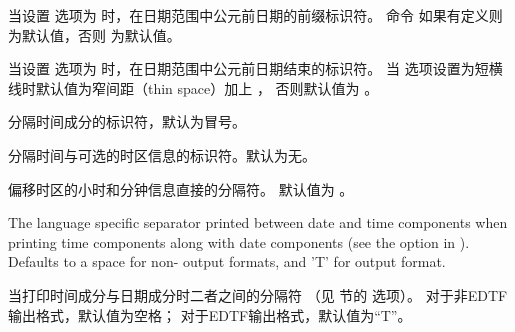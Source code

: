 \begin{ltxsyntax}

当设置  选项为  时，在日期范围中公元前日期的前缀标识符。
命令  如果有定义则为默认值，否则  为默认值。


当设置  选项为  时，在日期范围中公元前日期结束的标识符。
当  选项设置为短横线时默认值为窄间距（thin space）加上 ，
否则默认值为 。


分隔时间成分的标识符，默认为冒号。


分隔时间与可选的时区信息的标识符。默认为无。


偏移时区的小时和分钟信息直接的分隔符。
默认值为 。


The language specific separator printed between date and time components when printing time components along with date components (see the  option in ). Defaults to a space for non- output formats, and 'T' for  output format.

当打印时间成分与日期成分时二者之间的分隔符
（见  节的  选项）。
对于非EDTF输出格式，默认值为空格；
对于EDTF输出格式，默认值为“T”。


\end{ltxsyntax}
